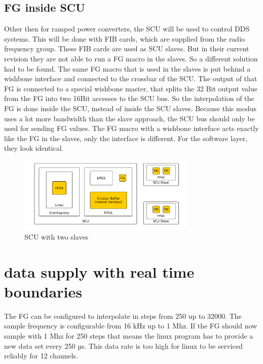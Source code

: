 \documentclass[a4paper,
              ]{jacow}
\begin{document}
\subsection{FG inside SCU}
Other then for ramped power converters, the SCU will be used to control DDS systems. This will be done with FIB cards, which are supplied from the radio frequency group. These FIB\cite{ref_fib} cards are used as SCU slaves. But in their current revision they are not able to run a FG macro in the slaves. So a different solution had to be found. The same FG macro that is used in the slaves is put behind a wishbone interface and connected to the crossbar of the SCU. The output of that FG is connected to a special wishbone master, that splits the 32 Bit output value from the FG into two 16Bit accesses to the SCU bus. So the interpolation of the FG is done inside the SCU, instead of inside the SCU slaves. Because this modus uses a lot more bandwidth than the slave approach, the SCU bus should only be used for sending FG values. The FG macro with a wishbone interface acts exactly like the FG in the slaves, only the interface is different. For the software layer, they look identical.

\begin{figure}[!htb]
   \centering
   \includegraphics*[width=85mm]{data_linux2fg}
   \caption{SCU with two slaves}
   \label{fig1}
\end{figure}

\section{data supply with real time boundaries}
The FG can be configured to interpolate in steps from 250 up to 32000. The sample frequency is configurable from 16 kHz up to 1 Mhz. If the FG should now sample with 1 Mhz for 250 steps
that means the linux program has to provide a new data set every 250 µs. This data rate is too high for linux to be serviced reliably for 12 channels.
\end{document}
